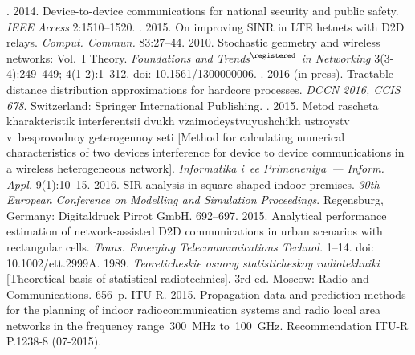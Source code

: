 \begin{multicols}{2}
{{\begin{thebibliography}{99}
. 2014. 
Device-to-device communications for national security and public safety. \textit{IEEE Access} 
2:1510--1520.
. 2015. On improving SINR in 
LTE hetnets with D2D relays. \textit{Comput. Commun.} 83:27--44.
 2010. Stochastic geometry and 
wireless networks: Vol.~I Theory. \textit{Foundations and Trends$^\registered$ in Networking} 
3(3-4):249--449; 4(1-2):1--312. doi: 10.1561/1300000006.
. 2016 (in press). Tractable 
distance distribution approximations for hardcore processes. \textit{DCCN 2016, CCIS 678}. 
Switzerland: Springer International Publishing. 
. 2015. Metod rascheta kharakteristik interferentsii 
dvukh vza\-imo\-dey\-st\-vu\-yushchikh ustroystv v~besprovodnoy geterogennoy seti [Method for 
calculating numerical characteristics of two devices interference for device to device 
communications in a wireless heterogeneous network]. \textit{Informatika i~ee Primeneniya~--- 
Inform. Appl.} 9(1):10--15. 
 2016. SIR analysis in square-shaped indoor premises. 
\textit{30th 
European Conference on Modelling and Simulation Proceedings}. Regensburg,
Germany: Digitaldruck Pirrot GmbH. 
692--697.
 2015. Analytical 
performance estimation of network-assisted D2D communications in urban scenarios with 
rectangular cells. \textit{Trans. Emerging Telecommunications Technol.}  
1--14. doi: 10.1002/ett.2999A. 
 1989. \textit{Teoreticheskie osnovy statisticheskoy radiotekhniki} 
[Theoretical basis of statistical radiotechnics]. 3rd ed. Moscow: Radio and Communications. 
656~p.
ITU-R. 2015. Propagation data and prediction methods for the planning of indoor 
radiocommunication systems and radio local area networks in the frequency range~300~MHz 
to~100~GHz. Recommendation ITU-R P.1238-8 (07-2015).
\end{thebibliography}

 }
 }

\end{multicols}

